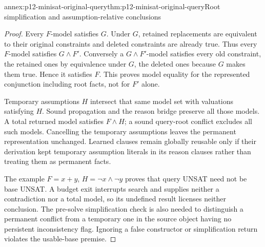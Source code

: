 \begin{annexitem}{annex:p12-minisat-original-query}{thm:p12-minisat-original-query}{Root simplification and assumption-relative conclusions}
\begin{proof}
Every \(F\)-model satisfies \(G\).  Under \(G\), retained replacements
are equivalent to their original constraints and deleted constraints are
already true.  Thus every \(F\)-model satisfies \(G\land F'\).
Conversely a \(G\land F'\)-model satisfies every old constraint, the
retained ones by equivalence under \(G\), the deleted ones because \(G\)
makes them true.  Hence it satisfies \(F\).  This proves model equality
for the represented conjunction including root facts, not for \(F'\) alone.

Temporary assumptions \(H\) intersect that same model set with valuations
satisfying \(H\).  Sound propagation and the reason bridge preserve all
those models.  A total returned model satisfies \(F\land H\); a sound
query-root conflict excludes all such models.  Cancelling the temporary
assumptions leaves the permanent representation unchanged.  Learned clauses
remain globally reusable only if their derivation kept temporary assumption
literals in its reason clauses rather than treating them as permanent facts.

The example \(F=x+y\), \(H=\neg x\land\neg y\) proves that query
UNSAT need not be base UNSAT.  A budget exit interrupts search and supplies
neither a contradiction nor a total model, so its undefined result licenses
neither conclusion.  The pre-solve simplification check is also needed to
distinguish a permanent conflict from a temporary one in the source object
having no persistent inconsistency flag.  Ignoring a false constructor or
simplification return violates the usable-base premise.
\end{proof}
\end{annexitem}
